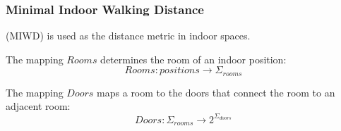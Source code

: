 \begin{frame}
\frametitle{Minimal Indoor Walking Distance}

(MIWD) is used as the distance metric in indoor spaces.
\pause

The mapping ${Rooms}$ determines the room of an indoor position:
\pause
\begin{equation}
{Rooms: positions \rightarrow \Sigma_{rooms}}
\end{equation}

\pause

The mapping ${Doors}$ maps a room to the doors that connect the room to an adjacent room:
\pause
\begin{equation}
{Doors: \Sigma_{rooms} \rightarrow 2^{\Sigma_{doors}}}
\end{equation}

\end{frame}


